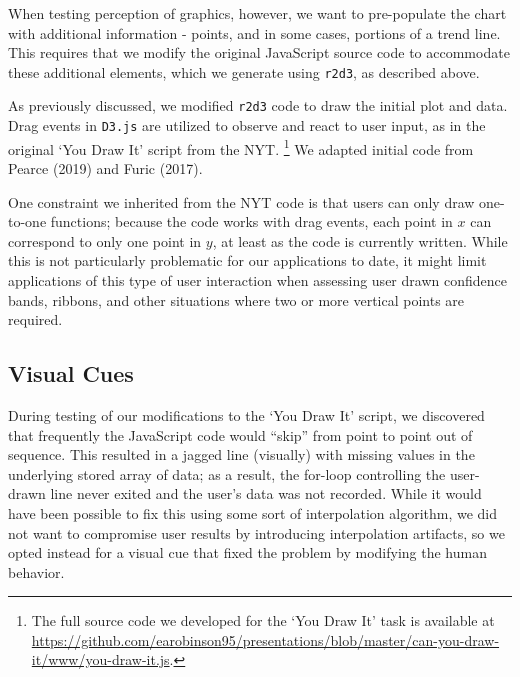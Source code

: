 \documentclass[
]{jds}
\begin{document}
When testing perception of graphics, however, we want to pre-populate
the chart with additional information - points, and in some cases,
portions of a trend line. This requires that we modify the original
JavaScript source code to accommodate these additional elements, which
we generate using \texttt{r2d3}, as described above.

As previously discussed, we modified \texttt{r2d3} code to draw the
initial plot and data. Drag events in \texttt{D3.js} are utilized to
observe and react to user input, as in the original `You Draw It' script
from the NYT. \footnote{The full source code we developed for the `You
  Draw It' task is available at
  \url{https://github.com/earobinson95/presentations/blob/master/can-you-draw-it/www/you-draw-it.js}.}
We adapted initial code from Pearce (2019) and Furic (2017).

One constraint we inherited from the NYT code is that users can only
draw one-to-one functions; because the code works with drag events, each
point in \(x\) can correspond to only one point in \(y\), at least as
the code is currently written. While this is not particularly
problematic for our applications to date, it might limit applications of
this type of user interaction when assessing user drawn confidence
bands, ribbons, and other situations where two or more vertical points
are required.

\hypertarget{visual-cues}{%
\subsection{Visual Cues}\label{visual-cues}}

During testing of our modifications to the `You Draw It' script, we
discovered that frequently the JavaScript code would ``skip'' from point
to point out of sequence. This resulted in a jagged line (visually) with
missing values in the underlying stored array of data; as a result, the
for-loop controlling the user-drawn line never exited and the user's
data was not recorded. While it would have been possible to fix this
using some sort of interpolation algorithm, we did not want to
compromise user results by introducing interpolation artifacts, so we
opted instead for a visual cue that fixed the problem by modifying the
human behavior.
\end{document}
